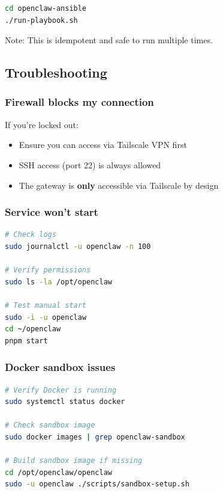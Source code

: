 \begin{lstlisting}[language=bash]
cd openclaw-ansible
./run-playbook.sh
\end{lstlisting}


Note: This is idempotent and safe to run multiple times.

\subsection{Troubleshooting}


\subsubsection{Firewall blocks my connection}


If you're locked out:

\begin{itemize}
  \item Ensure you can access via Tailscale VPN first
  \item SSH access (port 22) is always allowed
  \item The gateway is \textbf{only} accessible via Tailscale by design
\end{itemize}


\subsubsection{Service won't start}


\begin{lstlisting}[language=bash]
# Check logs
sudo journalctl -u openclaw -n 100

# Verify permissions
sudo ls -la /opt/openclaw

# Test manual start
sudo -i -u openclaw
cd ~/openclaw
pnpm start
\end{lstlisting}


\subsubsection{Docker sandbox issues}


\begin{lstlisting}[language=bash]
# Verify Docker is running
sudo systemctl status docker

# Check sandbox image
sudo docker images | grep openclaw-sandbox

# Build sandbox image if missing
cd /opt/openclaw/openclaw
sudo -u openclaw ./scripts/sandbox-setup.sh
\end{lstlisting}


